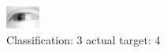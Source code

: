 \begin{figure}[h!]
\begin{center}
\includegraphics[width=0.60\columnwidth]{figures/ID2433_class_3_target_4.png}
\end{center}
\caption{ Classification: 3 actual target: 4}
\label{fig:ID2433_class_3_target_4}
\end{figure}
